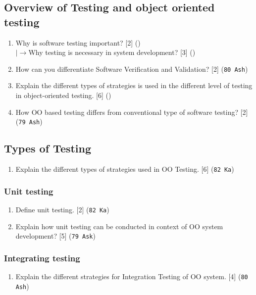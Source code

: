 \documentclass[12pt]{article}
\newcommand{\lb}{\\$\left|\rightarrow\right.$}
\begin{document}
  \subsection{Overview of Testing and object oriented testing}
    \begin{enumerate}
      \item Why is software testing important? \hfill [2] ()
        \lb Why testing is necessary in system development? \hfill [3] ()

      \item How can you differentiate Software Verification and Validation? \hfill [2] (\texttt{80 Ash})

      \item Explain the different types of strategies is used in the different level of testing in object-oriented testing. \hfill [6] ()

      \item How OO based testing differs from conventional type of software testing? \hfill [2] (\texttt{79 Ash})
    \end{enumerate}

  \subsection{Types of Testing}
    \begin{enumerate}
      \item Explain the different types of strategies used in OO Testing. \hfill [6] (\texttt{82 Ka})
    \end{enumerate}

    \subsubsection{Unit testing}
      \begin{enumerate}
        \item Define unit testing. \hfill [2] (\texttt{82 Ka})

        \item Explain how unit testing can be conducted in context of OO system development? \hfill [5] (\texttt{79 Ask})
      \end{enumerate}

    \subsubsection{Integrating testing}
      \begin{enumerate}
        \item Explain the different strategies for Integration Testing of OO system. \hfill [4] (\texttt{80 Ash})
      \end{enumerate}
\end{document}
